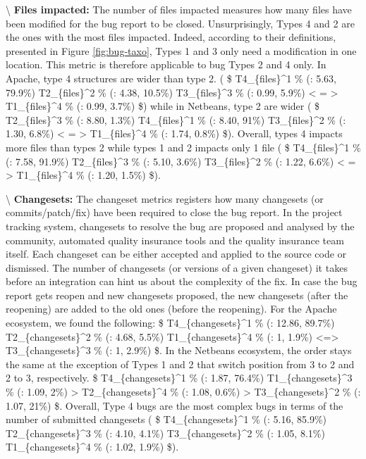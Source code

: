 \textbackslash{} \vspace{0.1cm} {\bf Files impacted:} The number of
files impacted measures how many files have been modified for the bug
report to be closed. Unsurprisingly, Types 4 and 2 are the ones with the
most files impacted. Indeed, according to their definitions, presented
in Figure \ref{fig:bug-taxo}, Types 1 and 3 only need a modification in
one location. This metric is therefore applicable to bug Types 2 and 4
only. In Apache, type 4 structures are wider than type 2. ( \$
T4\_\{files\}\^{}1 \% (\mu: 5.63, 79.9\%) \gg
T2\_\{files\}\^{}2 \% (\mu: 4.38, 10.5\%) \gg
T3\_\{files\}\^{}3 \% (\mu: 0.99, 5.9\%) \textless{} = \textgreater{}
T1\_\{files\}\^{}4 \% (\mu: 0.99, 3.7\%) \$) while in Netbeans, type 2
are wider ( \$ T2\_\{files\}\^{}3 \% (\mu: 8.80, 1.3\%) \gg
T4\_\{files\}\^{}1 \% (\mu: 8.40, 91\%) \gg
T3\_\{files\}\^{}2 \% (\mu: 1.30, 6.8\%) \textless{} = \textgreater{}
T1\_\{files\}\^{}4 \% (\mu: 1.74, 0.8\%) \$). Overall, types 4 impacts
more files than types 2 while types 1 and 2 impacts only 1 file ( \$
T4\_\{files\}\^{}1 \% (\mu: 7.58, 91.9\%) \gg
T2\_\{files\}\^{}3 \% (\mu: 5.10, 3.6\%) \gg
T3\_\{files\}\^{}2 \% (\mu: 1.22, 6.6\%) \textless{} = \textgreater{}
T1\_\{files\}\^{}4 \% (\mu: 1.20, 1.5\%) \$).

\textbackslash{} \vspace{0.1cm} {\bf Changesets: } The changeset metrics
registers how many changesets (or commits/patch/fix) have been required
to close the bug report. In the project tracking system, changesets to
resolve the bug are proposed and analysed by the community, automated
quality insurance tools and the quality insurance team itself. Each
changeset can be either accepted and applied to the source code or
dismissed. The number of changesets (or versions of a given changeset)
it takes before an integration can hint us about the complexity of the
fix. In case the bug report gets reopen and new changesets proposed, the
new changesets (after the reopening) are added to the old ones (before
the reopening). For the Apache ecosystem, we found the following: \$
T4\_\{changesets\}\^{}1 \% (\mu: 12.86, 89.7\%) \gg
T2\_\{changesets\}\^{}2 \% (\mu: 4.68, 5.5\%) \gg
T1\_\{changesets\}\^{}4 \% (\mu: 1, 1.9\%) \textless{}=\textgreater{}
T3\_\{changesets\}\^{}3 \% (\mu: 1, 2.9\%) \$. In the Netbeans
ecosystem, the order stays the same at the exception of Types 1 and 2
that switch position from 3 to 2 and 2 to 3, respectively. \$
T4\_\{changesets\}\^{}1 \% (\mu: 1.87, 76.4\%) \gg
T1\_\{changesets\}\^{}3 \% (\mu: 1.09, 2\%) \textgreater{}
T2\_\{changesets\}\^{}4 \% (\mu: 1.08, 0.6\%) \textgreater{}
T3\_\{changesets\}\^{}2 \% (\mu: 1.07, 21\%) \$. Overall, Type 4 bugs
are the most complex bugs in terms of the number of submitted changesets
( \$ T4\_\{changesets\}\^{}1 \% (\mu: 5.16, 85.9\%) \gg
T2\_\{changesets\}\^{}3 \% (\mu: 4.10, 4.1\%) \gg
T3\_\{changesets\}\^{}2 \% (\mu: 1.05, 8.1\%) \gg
T1\_\{changesets\}\^{}4 \% (\mu: 1.02, 1.9\%) \$).

